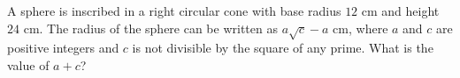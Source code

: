 A sphere is inscribed in a right circular cone with base radius $12$ cm and height $24$ cm. The radius of the sphere can be written as $a\sqrt c-a$ cm, where $a$ and $c$ are positive integers and $c$ is not divisible by the square of any prime. What is the value of $a+c$?
